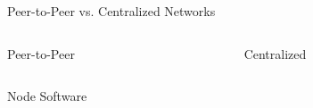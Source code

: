 \documentclass[handout]{beamer}
\begin{document}
\begin{frame}{Peer-to-Peer vs. Centralized Networks}

	\begin{columns}
		\begin{column}{0.5\textwidth}
			\begin{center}
				Peer-to-Peer
			\end{center}
		\end{column}
		\begin{column}{0.5\textwidth}
			\begin{center}
				Centralized
			\end{center}
		\end{column}
	\end{columns}
	\vspace{.8 cm}
	\begin{columns}[T]
		\begin{column}{0.5\textwidth}
			\begin{tikzpicture}[scale=0.7, every node/.style={scale=0.7}]
				
			\end{tikzpicture}
		\end{column}
		\begin{column}{0.5\textwidth}
			\begin{tikzpicture}[scale=0.7, every node/.style={scale=0.7}]
				
			\end{tikzpicture}
		\end{column}
	\end{columns}
\end{frame}


\begin{frame}{Node Software}
	\centering
	\begin{tikzpicture}[scale=0.715, every node/.style={scale=1}]
		
	\end{tikzpicture}
	\vspace{3.5 cm}
\end{frame}
\end{document}
